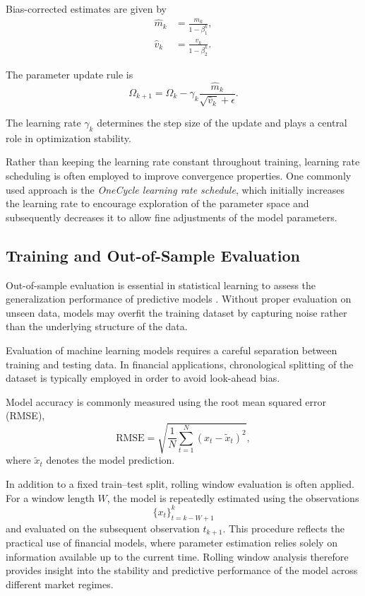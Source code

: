 Bias-corrected estimates are given by
\begin{align}
\hat{m}_k &= \frac{m_k}{1-\beta_1^k}, \\
\hat{v}_k &= \frac{v_k}{1-\beta_2^k}.
\end{align}

The parameter update rule is
\begin{equation}
\Omega_{k+1}
=
\Omega_k
-
\gamma_k
\frac{\hat{m}_k}{\sqrt{\hat{v}_k} + \epsilon}.
\end{equation}

The learning rate $\gamma_k$ determines the step size of the update and plays a central role in optimization stability.

Rather than keeping the learning rate constant throughout training, learning rate scheduling is often employed to improve convergence properties. One commonly used approach is the \emph{OneCycle learning rate schedule}, which initially increases the learning rate to encourage exploration of the parameter space and subsequently decreases it to allow fine adjustments of the model parameters.

\subsection{Training and Out-of-Sample Evaluation}

Out-of-sample evaluation is essential in statistical learning to assess the generalization performance of predictive models \citep{Bishop2006}. Without proper evaluation on unseen data, models may overfit the training dataset by capturing noise rather than the underlying structure of the data.

Evaluation of machine learning models requires a careful separation between training and testing data. In financial applications, chronological splitting of the dataset is typically employed in order to avoid look-ahead bias.

Model accuracy is commonly measured using the root mean squared error (RMSE),
\begin{equation}
\text{RMSE}
=
\sqrt{
\frac{1}{N}
\sum_{t=1}^{N}
\left(
x_t - \tilde{x}_t
\right)^2
},
\end{equation}
where $\tilde{x}_t$ denotes the model prediction.

In addition to a fixed train--test split, rolling window evaluation is often applied. For a window length $W$, the model is repeatedly estimated using the observations
\[
\{x_t\}_{t=k-W+1}^{k}
\]
and evaluated on the subsequent observation $t_{k+1}$. This procedure reflects the practical use of financial models, where parameter estimation relies solely on information available up to the current time. Rolling window analysis therefore provides insight into the stability and predictive performance of the model across different market regimes.